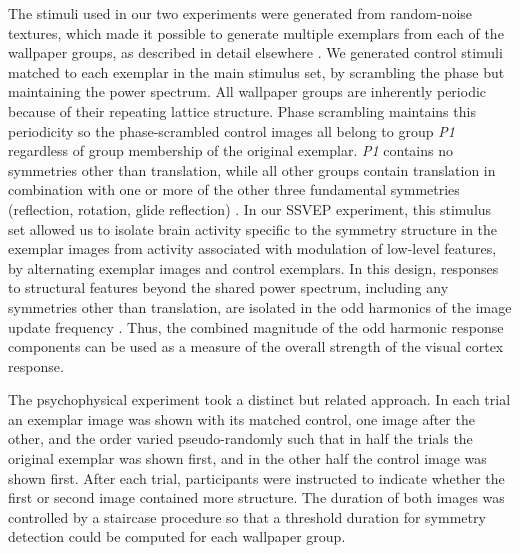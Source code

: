 \documentclass[11pt, twoside]{article}
\begin{document}
The stimuli used in our two experiments were generated from random-noise textures, which made it possible to generate multiple exemplars from each of the wallpaper groups, as described in detail elsewhere \cite{RN1725}. We generated control stimuli matched to each exemplar in the main stimulus set, by scrambling the phase but maintaining the power spectrum. All wallpaper groups are inherently periodic because of their repeating lattice structure. Phase scrambling maintains this periodicity so the phase-scrambled control images all belong to group \textit{P1} regardless of group membership of the original exemplar. \textit{P1} contains no symmetries other than translation, while all other groups contain translation in combination with one or more of the other three fundamental symmetries (reflection, rotation, glide reflection) \cite{RN1425}. In our SSVEP experiment, this stimulus set allowed us to isolate brain activity specific to the symmetry structure in the exemplar images from activity associated with modulation of low-level features, by alternating exemplar images and control exemplars. In this design, responses to structural features beyond the shared power spectrum, including any symmetries other than translation, are isolated in the odd harmonics of the image update frequency \cite{RN1725,RN1540, RN1954}. Thus, the combined magnitude of the odd harmonic response components can be used as a measure of the overall strength of the visual cortex response.

The psychophysical experiment took a distinct but related approach. In each trial an exemplar image was shown with its matched control, one image after the other, and the order varied pseudo-randomly such that in half the trials the original exemplar was shown first, and in the other half the control image was shown first. After each trial, participants were instructed to indicate whether the first or second image contained more structure. The duration of both images was controlled by a staircase procedure so that a threshold duration for symmetry detection could be computed for each wallpaper group. 
\end{document}
